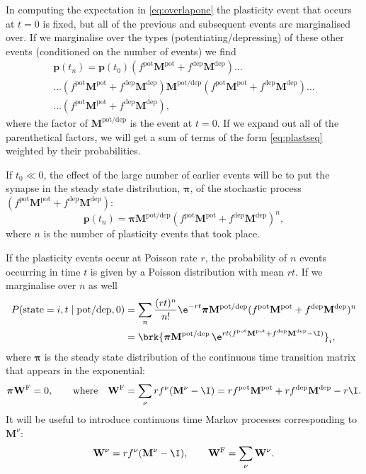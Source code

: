 \documentclass[12pt]{article}
\newcommand{\prm}{p}
\newcommand{\pr}{\mathbf{\prm}}
\newcommand{\eqm}{\pi}
\newcommand{\eq}{\boldsymbol{\eqm}}
\newcommand{\Wm}{W}
\newcommand{\W}{\mathbf{\Wm}}
\newcommand{\MMdm}{M}
\newcommand{\MMd}{\mathbf{\MMdm}}
\newcommand{\frg}{\W^{\mathrm{F}}}
\newcommand{\pot}{^{\text{pot}}}
\newcommand{\dep}{^{\text{dep}}}
\newcommand{\potdep}{^{\text{pot/dep}}}
\begin{document}
In computing the expectation in \eqref{eq:overlapone} the plasticity event that occurs at \(t=0\) is fixed, but all of the previous and subsequent events are marginalised over.
If we marginalise over the types (potentiating/depressing) of these other events (conditioned on the number of events) we find
%
\begin{multline}\label{eq:plastseqtypes}
  \pr(t_n) = \pr(t_0) (f\pot \MMd \pot + f\dep \MMd \dep)  \ldots \\
    \ldots (f\pot \MMd \pot + f\dep \MMd \dep) 
     \MMd \potdep (f\pot \MMd \pot + f\dep \MMd \dep) \ldots \\
    \ldots (f\pot \MMd \pot + f\dep \MMd \dep),
\end{multline}
% 
where the factor of \( \MMd \potdep\) is the event at \(t=0\).
If we expand out all of the parenthetical factors, we will get a sum of terms of the form \eqref{eq:plastseq} weighted by their probabilities.

If \(t_0 \ll 0\), the effect of the large number of earlier events will be to put the synapse in the steady state distribution, \(\eq\), of the stochastic process \((f\pot \MMd \pot+f\dep \MMd \dep)\):
%
\begin{equation}\label{eq:plastseqeq}
  \pr(t_n) = \eq  \MMd \potdep (f\pot \MMd \pot+f\dep \MMd \dep)^n,
\end{equation}
%
where \(n\) is the number of plasticity events that took place.

If the plasticity events occur at Poisson rate \(r\), the probability of \(n\) events occurring in time \(t\) is given by a Poisson distribution with mean \(rt\).
If we marginalise over \(n\) as well
%
\begin{equation}\label{eq:plastseqav}
\begin{aligned}
  P(\text{state}=i,t \mid \text{pot/dep},0)
    &= \sum_n \frac{(rt)^n}{n!} \e^{-rt} \eq  \MMd \potdep (f\pot \MMd \pot+f\dep \MMd \dep)^n \\
    &= \brk{ \eq  \MMd \potdep\, \e^{rt(f\pot \MMd \pot+f\dep \MMd \dep-\I) } }_i,
\end{aligned}
\end{equation}
%
where \(\eq\) is the steady state distribution of the continuous time transition matrix that appears in the exponential:
%
\begin{equation}\label{eq:eq}
  \eq\frg = 0,
  \qquad\text{where}\quad
  \frg = \sum_\nu r f^\nu (\MMd^\nu - \I)
    = r f\pot \MMd \pot + r f\dep \MMd \dep - r \I.
\end{equation}
%
It will be useful to introduce continuous time Markov processes corresponding to \(\MMd^\nu \):
%
\begin{equation*}
  \W^\nu = r f^\nu (\MMd^\nu - \I),
  \qquad
  \frg = \sum_{\nu} \W^\nu.
\end{equation*}
%
\end{document}
